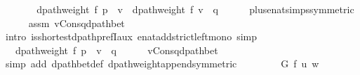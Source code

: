 \begin{isabellebody}
\ \ \isamarkupfalse%
\ \isamarkupfalse%
\ {\isachardoublequoteopen}{\isachardot}{\kern0pt}{\isachardot}{\kern0pt}{\isachardot}{\kern0pt}\ {\isacharless}{\kern0pt}\ dpath{\isacharunderscore}{\kern0pt}weight\ f\ {\isacharparenleft}{\kern0pt}p\ {\isacharat}{\kern0pt}\ {\isacharbrackleft}{\kern0pt}v{\isacharbrackright}{\kern0pt}{\isacharparenright}{\kern0pt}\ {\isacharplus}{\kern0pt}\ dpath{\isacharunderscore}{\kern0pt}weight\ f\ {\isacharparenleft}{\kern0pt}v\ {\isacharhash}{\kern0pt}\ q{\isacharparenright}{\kern0pt}{\isachardoublequoteclose}\isanewline
\ \ \ \ \isamarkupfalse%
\ plus{\isacharunderscore}{\kern0pt}enat{\isacharunderscore}{\kern0pt}simps{\isacharbrackleft}{\kern0pt}symmetric{\isacharbrackright}{\kern0pt}\isanewline
\ \ \ \ \isamarkupfalse%
\ assm\ v{\isacharunderscore}{\kern0pt}Cons{\isacharunderscore}{\kern0pt}q{\isacharunderscore}{\kern0pt}dpath{\isacharunderscore}{\kern0pt}bet\isanewline
\ \ \ \ \isamarkupfalse%
\ {\isacharparenleft}{\kern0pt}intro\ is{\isacharunderscore}{\kern0pt}shortest{\isacharunderscore}{\kern0pt}dpath{\isacharunderscore}{\kern0pt}prefI{\isacharunderscore}{\kern0pt}aux\ enat{\isacharunderscore}{\kern0pt}add{\isacharunderscore}{\kern0pt}strict{\isacharunderscore}{\kern0pt}left{\isacharunderscore}{\kern0pt}mono{\isacharparenright}{\kern0pt}\ simp{\isacharplus}{\kern0pt}\isanewline
\ \ \isamarkupfalse%
\ \isamarkupfalse%
\ {\isachardoublequoteopen}{\isachardot}{\kern0pt}{\isachardot}{\kern0pt}{\isachardot}{\kern0pt}\ {\isacharequal}{\kern0pt}\ dpath{\isacharunderscore}{\kern0pt}weight\ f\ {\isacharparenleft}{\kern0pt}p\ {\isacharat}{\kern0pt}\ {\isacharbrackleft}{\kern0pt}v{\isacharbrackright}{\kern0pt}\ {\isacharat}{\kern0pt}\ q{\isacharparenright}{\kern0pt}{\isachardoublequoteclose}\isanewline
\ \ \ \ \isamarkupfalse%
\ v{\isacharunderscore}{\kern0pt}Cons{\isacharunderscore}{\kern0pt}q{\isacharunderscore}{\kern0pt}dpath{\isacharunderscore}{\kern0pt}bet\isanewline
\ \ \ \ \isamarkupfalse%
\ {\isacharparenleft}{\kern0pt}simp\ add{\isacharcolon}{\kern0pt}\ dpath{\isacharunderscore}{\kern0pt}bet{\isacharunderscore}{\kern0pt}def\ dpath{\isacharunderscore}{\kern0pt}weight{\isacharunderscore}{\kern0pt}append{\isacharunderscore}{\kern0pt}{}{\isacharbrackleft}{\kern0pt}symmetric{\isacharbrackright}{\kern0pt}{\isacharparenright}{\kern0pt}\isanewline
\ \ \isamarkupfalse%
\ \isamarkupfalse%
\ {\isachardoublequoteopen}{\isachardot}{\kern0pt}{\isachardot}{\kern0pt}{\isachardot}{\kern0pt}\ {\isacharequal}{\kern0pt}\ {\isasymdelta}\ G\ f\ u\ w{\isachardoublequoteclose}\isanewline

\end{isabellebody}
